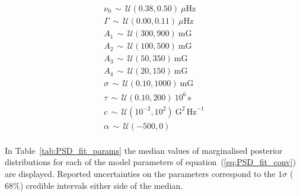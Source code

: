 \begin{gather*}
%
\nu_0 \, \sim \,\mathcal{U}(0.38, 0.50) \> \mu\mathrm{Hz} \\
%
\Gamma \, \sim \,\mathcal{U}(0.00, 0.11)  \> \mu\mathrm{Hz} \\
%
A_1 \, \sim \,\mathcal{U}(300, 900)  \> \mathrm{mG} \\
%
A_2 \, \sim \,\mathcal{U}(100, 500)  \> \mathrm{mG} \\
%
A_3 \, \sim \,\mathcal{U}(50, 350)  \> \mathrm{mG} \\
%
A_4 \, \sim \,\mathcal{U}(20, 150)  \> \mathrm{mG} \\
%
\sigma \, \sim \,\mathcal{U}(0.10, 1000)  \> \mathrm{mG} \\
%
\tau \, \sim \,\mathcal{U}(0.10, 200)  \> 10^6 \, \mathrm{s} \\
%
c \, \sim \,\mathcal{U}(10^{-2}, 10^{2})  \> \mathrm{G}^2 \, \mathrm{Hz}^{-1} \\
%
\alpha \, \sim \,\mathcal{U}(-500, 0)\\
\end{gather*}


In Table~\ref{tab:PSD_fit_params} the median values of marginalised posterior distributions for each of the model parameters of equation~(\ref{eq:PSD_fit_conv}) are displayed. Reported uncertainties on the parameters correspond to the $1\sigma$ ($68 \%$) credible intervals either side of the median. 

